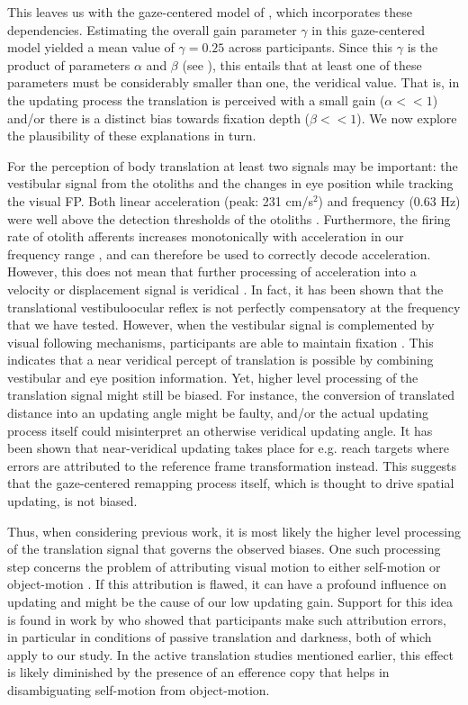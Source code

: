This leaves us with the gaze-centered model of , which incorporates these dependencies. Estimating the overall gain parameter $\gamma$ in this gaze-centered model yielded a mean value of $\gamma = 0.25$ across participants. Since this $\gamma$ is the product of parameters $\alpha$ and $\beta$ (see ), this entails that at least one of these parameters must be considerably smaller than one, the veridical value. That is, in the updating process the translation is perceived with a small gain ($\alpha << 1$) and/or there is a distinct bias towards fixation depth ($\beta << 1$). We now explore the plausibility of these explanations in turn. 

For the perception of body translation at least two signals may be important: the vestibular signal from the otoliths and the changes in eye position while tracking the visual FP. Both linear acceleration (peak: 231 cm/s$^2$) and frequency (0.63 Hz) were well above the detection thresholds of the otoliths \cite{benson1986, yu2012}. Furthermore, the firing rate of otolith afferents increases monotonically with acceleration in our frequency range \cite{fernandez1976, yu2012}, and can therefore be used to correctly decode acceleration. However, this does not mean that further processing of acceleration into a velocity or displacement signal is veridical \cite{merfeld2005}. In fact, it has been shown that the translational vestibuloocular reflex is not perfectly compensatory at the frequency that we have tested. However, when the vestibular signal is complemented by visual following mechanisms, participants are able to maintain fixation \cite{medendorp2002, paige1998}. This indicates that a near veridical percept of translation is possible by combining vestibular and eye position information. Yet, higher level processing of the translation signal might still be biased. For instance, the conversion of translated distance into an updating angle might be faulty, and/or the actual updating process itself could misinterpret an otherwise veridical updating angle. It has been shown that near-veridical updating takes place for e.g. reach targets \cite{henriques1998, vanpelt2007} where errors are attributed to the reference frame transformation instead. This suggests that the gaze-centered remapping process itself, which is thought to drive spatial updating, is not biased.

Thus, when considering previous work, it is most likely the higher level processing of the translation signal that governs the observed biases. One such processing step concerns the problem of attributing visual motion to either self-motion or object-motion \cite{vonhelmholtz1867}. If this attribution is flawed, it can have a profound influence on updating and might be the cause of our low updating gain. Support for this idea is found in work by  who showed that participants make such attribution errors, in particular in conditions of passive translation and darkness, both of which apply to our study. In the active translation studies mentioned earlier, this effect is likely diminished by the presence of an efference copy that helps in disambiguating self-motion from object-motion.

